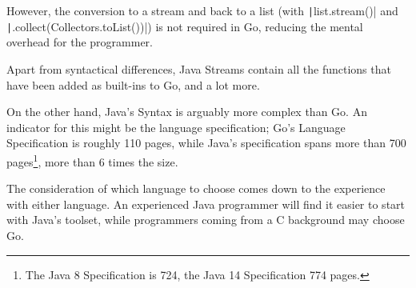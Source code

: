 However, the conversion to a stream and back to a list (with \texttt|list.stream()| and
\texttt|.collect(Collectors.toList())|)
is not required in Go, reducing the mental overhead for the programmer.

Apart from syntactical differences, Java Streams contain all the functions that
have been added as built-ins to Go, and a lot more.

On the other hand, Java's Syntax is arguably more complex than Go. An indicator for this might be
the language specification; Go's Language Specification is roughly 110 pages, while
Java's specification spans more than 700 pages\footnote{
	The Java 8 Specification is 724\autocite{java-8-spec}, the Java 14
	Specification 774\autocite{java-14-spec} pages.}, more than 6 times the size.

The consideration of which language to choose comes down to the experience with either language.
An experienced Java programmer will find it easier to start with Java's toolset, while programmers
coming from a C background may choose Go.
